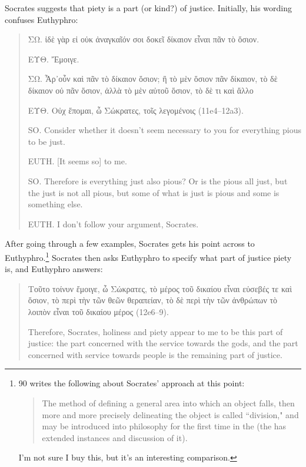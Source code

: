 \documentclass[11pt]{article}
\begin{document}
Socrates suggests that piety is a part (or kind?) of justice. Initially, his wording confuses Euthyphro:

\begin{quote}
    ΣΩ. ἰδὲ γὰρ εἰ οὐκ ἀναγκαῖόν σοι δοκεῖ δίκαιον εἶναι πᾶν τὸ ὅσιον.

    ΕΥΘ. Ἔμοιγε.

    ΣΩ. Ἆρ᾽οὖν καὶ πᾶν τὸ δίκαιον ὅσιον; ἢ τὸ μὲν ὅσιον πᾶν δίκαιον, τὸ δὲ δίκαιον οὐ πᾶν ὅσιον, ἀλλὰ τὸ μὲν αὐτοῦ ὅσιον, τὸ δὲ τι καὶ ἄλλο

    ΕΥΘ. Οὐχ ἕπομαι, ὦ Σώκρατες, τοῖς λεγομένοις (11e4--12a3).

    SO. Consider whether it doesn't seem necessary to you for everything pious to be just.

    EUTH. [It seems so] to me.

    SO. Therefore is everything just also pious? Or is the pious all just, but the just is not all pious, but some of what is just is pious and some is something else.

    EUTH. I don't follow your argument, Socrates.
\end{quote}

After going through a few examples, Socrates gets his point across to Euthyphro.\footnote{\citet{bailly2003} 90 writes the following about Socrates' approach at this point:

\begin{quote}
    The method of defining a general area into which an object falls, then more and more precisely delineating the object is called ``division," and may be introduced into philosophy for the first time in the  (the  has extended instances and discussion of it).
\end{quote}

I'm not sure I buy this, but it's an interesting comparison.}  Socrates then asks Euthyphro to specify what part of justice piety is, and Euthyphro answers:

\begin{quote}
    Τοῦτο τοίνυν ἔμοιγε, ὦ Σώκρατες, τὸ μέρος τοῦ δικαίου εἶναι εὐσεβές τε καὶ ὅσιον, τὸ περὶ τὴν τῶν θεῶν θεραπείαν, τὸ δὲ περὶ τὴν τῶν ἀνθρώπων τὸ λοιπὸν εἶναι τοῦ δικαίου μέρος (12e6--9).

    Therefore, Socrates, holiness and piety appear to me to be this part of justice: the part concerned with the service towards the gods, and the part concerned with service towards people is the remaining part of justice.
\end{quote}
\end{document}
